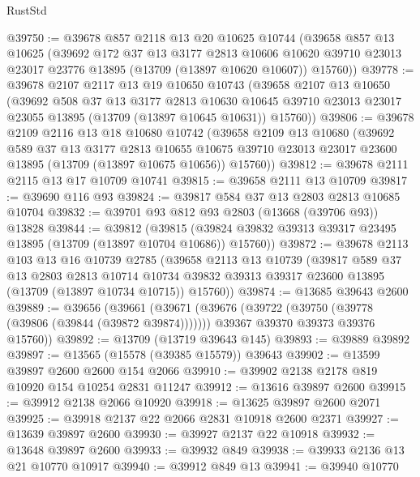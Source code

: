 \begin{lexlean}{RustStd}
\begin{coremodule}
@39750 := @39678
    @857
    @2118
    @13
    @20
    @10625
    @10744
    (@39658
      @857
      @13
      @10625
      (@39692
        @172
        @37
        @13
        @3177
        @2813
        @10606
        @10620
        @39710
        @23013
        @23017
        @23776
        @13895
        (@13709 (@13897 @10620 @10607))
        @15760))
@39778 := @39678
    @2107
    @2117
    @13
    @19
    @10650
    @10743
    (@39658
      @2107
      @13
      @10650
      (@39692
        @508
        @37
        @13
        @3177
        @2813
        @10630
        @10645
        @39710
        @23013
        @23017
        @23055
        @13895
        (@13709 (@13897 @10645 @10631))
        @15760))
@39806 := @39678
    @2109
    @2116
    @13
    @18
    @10680
    @10742
    (@39658
      @2109
      @13
      @10680
      (@39692
        @589
        @37
        @13
        @3177
        @2813
        @10655
        @10675
        @39710
        @23013
        @23017
        @23600
        @13895
        (@13709 (@13897 @10675 @10656))
        @15760))
@39812 := @39678 @2111 @2115 @13 @17 @10709 @10741
@39815 := @39658 @2111 @13 @10709
@39817 := @39690 @116 @93
@39824 := @39817 @584 @37 @13 @2803 @2813 @10685 @10704
@39832 := @39701 @93 @812 @93 @2803 (@13668 (@39706 @93)) @13828
@39844 := @39812
    (@39815 (@39824 @39832 @39313 @39317 @23495 @13895 (@13709 (@13897 @10704 @10686)) @15760))
@39872 := @39678
    @2113
    @103
    @13
    @16
    @10739
    @2785
    (@39658
      @2113
      @13
      @10739
      (@39817
        @589
        @37
        @13
        @2803
        @2813
        @10714
        @10734
        @39832
        @39313
        @39317
        @23600
        @13895
        (@13709 (@13897 @10734 @10715))
        @15760))
@39874 := @13685 @39643 @2600
@39889 := @39656
    (@39661
      (@39671
        (@39676 (@39722 (@39750 (@39778 (@39806 (@39844 (@39872 @39874)))))))
        @39367
        @39370
        @39373
        @39376
        @15760))
@39892 := @13709 (@13719 @39643 @145)
@39893 := @39889 @39892
@39897 := @13565 (@15578 (@39385 @15579)) @39643
@39902 := @13599 @39897 @2600 @2600 @154 @2066
@39910 := @39902 @2138 @2178 @819 @10920 @154 @10254 @2831 @11247
@39912 := @13616 @39897 @2600
@39915 := @39912 @2138 @2066 @10920
@39918 := @13625 @39897 @2600 @2071
@39925 := @39918 @2137 @22 @2066 @2831 @10918 @2600 @2371
@39927 := @13639 @39897 @2600
@39930 := @39927 @2137 @22 @10918
@39932 := @13648 @39897 @2600
@39933 := @39932 @849
@39938 := @39933 @2136 @13 @21 @10770 @10917
@39940 := @39912 @849 @13
@39941 := @39940 @10770

\end{coremodule}
\end{lexlean}
